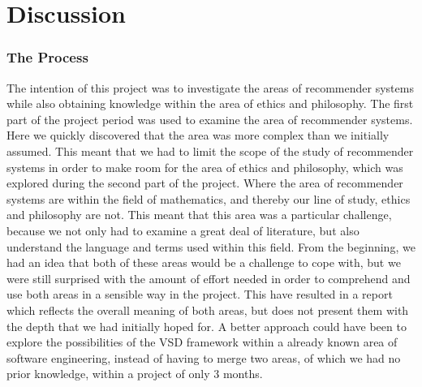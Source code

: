 \section{Discussion}

\subsubsection*{The Process}
\label{subsubsec:process}
The intention of this project was to investigate the areas of recommender systems while also obtaining knowledge within the area of ethics and philosophy.\newline
The first part of the project period was used to examine the area of recommender systems. Here we quickly discovered that the area was more complex than we initially assumed. This meant that we had to limit the scope of the study of recommender systems in order to make room for the area of ethics and philosophy, which was explored during the second part of the project.\newline
Where the area of recommender systems are within the field of mathematics, and thereby our line of study, ethics and philosophy are not. This meant that this area was a particular challenge, because we not only had to examine a great deal of literature, but also understand the language and terms used within this field.\newline
From the beginning, we had an idea that both of these areas would be a challenge to cope with, but we were still surprised with the amount of effort needed in order to comprehend and use both areas in a sensible way in the project. This have resulted in a report which reflects the overall meaning of both areas, but does not present them with the depth that we had initially hoped for.\newline
A better approach could have been to explore the possibilities of the VSD framework within a already known area of software engineering, instead of having to merge two areas, of which we had no prior knowledge, within a project of only 3 months. 
 

